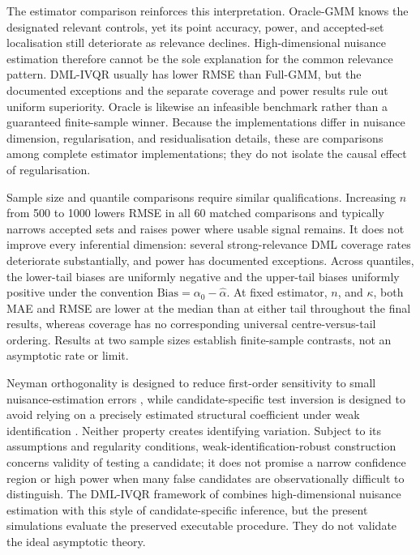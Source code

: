 The estimator comparison reinforces this interpretation. Oracle-GMM knows the designated relevant controls, yet its point accuracy, power, and accepted-set localisation still deteriorate as relevance declines. High-dimensional nuisance estimation therefore cannot be the sole explanation for the common relevance pattern. DML-IVQR usually has lower RMSE than Full-GMM, but the documented exceptions and the separate coverage and power results rule out uniform superiority. Oracle is likewise an infeasible benchmark rather than a guaranteed finite-sample winner. Because the implementations differ in nuisance dimension, regularisation, and residualisation details, these are comparisons among complete estimator implementations; they do not isolate the causal effect of regularisation.

Sample size and quantile comparisons require similar qualifications. Increasing $n$ from 500 to 1000 lowers RMSE in all 60 matched comparisons and typically narrows accepted sets and raises power where usable signal remains. It does not improve every inferential dimension: several strong-relevance DML coverage rates deteriorate substantially, and power has documented exceptions. Across quantiles, the lower-tail biases are uniformly negative and the upper-tail biases uniformly positive under the convention $\mathrm{Bias}=\alpha_0-\widehat\alpha$. At fixed estimator, $n$, and $\kappa$, both MAE and RMSE are lower at the median than at either tail throughout the final results, whereas coverage has no corresponding universal centre-versus-tail ordering. Results at two sample sizes establish finite-sample contrasts, not an asymptotic rate or limit.

Neyman orthogonality is designed to reduce first-order sensitivity to small nuisance-estimation errors \parencite{chernozhukov_et_al_2018}, while candidate-specific test inversion is designed to avoid relying on a precisely estimated structural coefficient under weak identification \parencite{chernozhukov_hansen_2008}. Neither property creates identifying variation. Subject to its assumptions and regularity conditions, weak-identification-robust construction concerns validity of testing a candidate; it does not promise a narrow confidence region or high power when many false candidates are observationally difficult to distinguish. The DML-IVQR framework of \textcite{chen_huang_tien_2021} combines high-dimensional nuisance estimation with this style of candidate-specific inference, but the present simulations evaluate the preserved executable procedure. They do not validate the ideal asymptotic theory.

